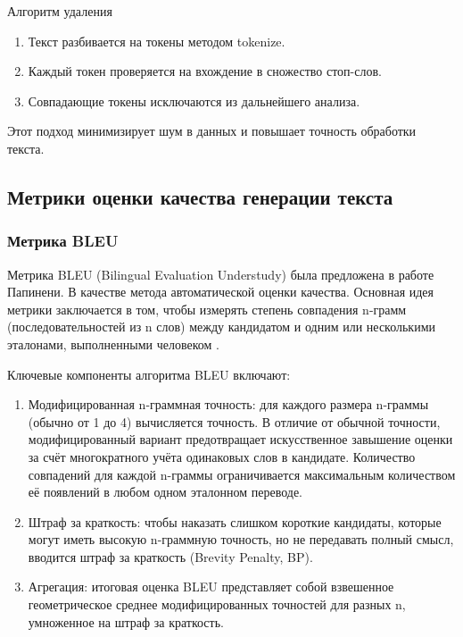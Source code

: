 \documentclass[coursework]{SCWorks}
\begin{document}
    Алгоритм удаления
    \begin{enumerate}
        \item Текст разбивается на токены методом {tokenize}.
        \item Каждый токен проверяется на вхождение в сножество стоп-слов.
        \item Совпадающие токены исключаются из дальнейшего анализа.
    \end{enumerate}

    Этот подход минимизирует шум в данных и повышает точность обработки текста\cite{AstapovMukhamadeeva}.

    \subsection{Метрики оценки качества генерации текста}

    \subsubsection{Метрика BLEU}

    Метрика BLEU (Bilingual Evaluation Understudy) была предложена в работе Папинени.
    В качестве метода автоматической оценки качества.
    Основная идея метрики заключается в том, чтобы измерять степень совпадения n-грамм (последовательностей из n слов) между
    кандидатом и одним или несколькими эталонами, выполненными человеком \cite{papineni2002bleu}.

    Ключевые компоненты алгоритма BLEU включают:

    \begin{enumerate}
        \item Модифицированная n-граммная точность: для каждого размера n-граммы (обычно от 1 до 4) вычисляется точность.
        В отличие от обычной точности, модифицированный вариант предотвращает искусственное завышение оценки за счёт многократного
        учёта одинаковых слов в кандидате.
        Количество совпадений для каждой n-граммы ограничивается максимальным количеством её появлений в любом одном эталонном переводе.
        \item Штраф за краткость: чтобы наказать слишком короткие кандидаты, которые могут иметь высокую n-граммную точность,
        но не передавать полный смысл, вводится штраф за краткость (Brevity Penalty, BP).
        \item Агрегация: итоговая оценка BLEU представляет собой взвешенное геометрическое среднее модифицированных точностей для
        разных n, умноженное на штраф за краткость.
    \end{enumerate}
\end{document}
